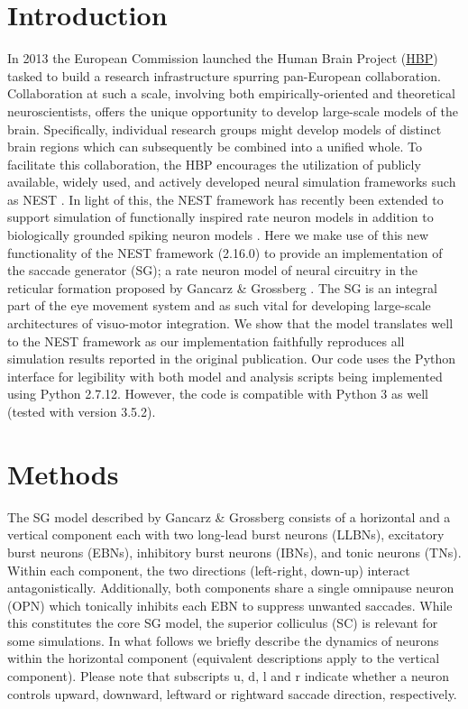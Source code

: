 \documentclass[10pt,a4paper,onecolumn]{article}
\begin{document}
\section{Introduction}\label{introduction}

In 2013 the European Commission launched the Human Brain Project
(\href{https://www.humanbrainproject.eu/en/}{HBP}) tasked to build a
research infrastructure spurring pan-European collaboration.
Collaboration at such a scale, involving both empirically-oriented and
theoretical neuroscientists, offers the unique opportunity to develop
large-scale models of the brain. Specifically, individual research
groups might develop models of distinct brain regions which can
subsequently be combined into a unified whole. To facilitate this
collaboration, the HBP encourages the utilization of publicly available,
widely used, and actively developed neural simulation frameworks such as
NEST \autocite{Gewaltig2007}. In light of this, the NEST framework has
recently been extended to support simulation of functionally inspired
rate neuron models in addition to biologically grounded spiking neuron
models \autocite{Hahne2017}. Here we make use of this new functionality
of the NEST framework (2.16.0) to provide an implementation of the
saccade generator (SG); a rate neuron model of neural circuitry in the
reticular formation proposed by Gancarz \& Grossberg
\autocite{Gancarz1998}. The SG is an integral part of the eye movement
system \autocite{Grossberg2012} and as such vital for developing
large-scale architectures of visuo-motor integration. We show that the
model translates well to the NEST framework as our implementation
faithfully reproduces all simulation results reported in the original
publication. Our code uses the Python interface \autocite{Eppler2008}
for legibility with both model and analysis scripts being implemented
using Python 2.7.12. However, the code is compatible with Python 3 as
well (tested with version 3.5.2).

\section{Methods}\label{methods}

The SG model described by Gancarz \& Grossberg \autocite{Gancarz1998}
consists of a horizontal and a vertical component each with two
long-lead burst neurons (LLBNs), excitatory burst neurons (EBNs),
inhibitory burst neurons (IBNs), and tonic neurons (TNs). Within each
component, the two directions (left-right, down-up) interact
antagonistically. Additionally, both components share a single omnipause
neuron (OPN) which tonically inhibits each EBN to suppress unwanted
saccades. While this constitutes the core SG model, the superior
colliculus (SC) is relevant for some simulations. In what follows we
briefly describe the dynamics of neurons within the horizontal component
(equivalent descriptions apply to the vertical component). Please note
that subscripts \(\mathrm{u}\), \(\mathrm{d}\), \(\mathrm{l}\) and
\(\mathrm{r}\) indicate whether a neuron controls upward, downward,
leftward or rightward saccade direction, respectively.
\end{document}
